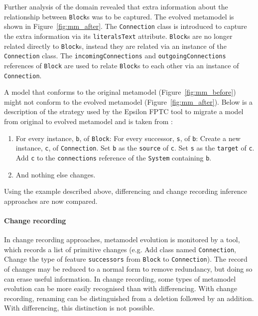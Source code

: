 Further analysis of the domain revealed that extra information about the relationship between \texttt{Block}s was to be captured. The evolved metamodel is shown in Figure~\ref{fig:mm_after}. The \texttt{Co\-nn\-ec\-ti\-on} class is introduced to capture the extra information via its \texttt{li\-te\-ra\-lsTe\-xt} attribute. \texttt{Block}s are no longer related directly to \texttt{Bl\-o\-ck}s, instead they are related via an instance of the \texttt{Co\-nn\-ec\-ti\-on} class. The \texttt{in\-com\-i\-ngCo\-nn\-ec\-ti\-o\-ns} and \texttt{ou\-tgo\-i\-ngCo\-nn\-ec\-ti\-o\-ns} references of \texttt{Bl\-o\-ck} are used to relate \texttt{Bl\-o\-ck}s to each other via an instance of \texttt{Co\-nn\-ec\-ti\-on}.

A model that conforms to the original metamodel (Figure~\ref{fig:mm_before}) might not conform to the evolved metamodel (Figure~\ref{fig:mm_after}). Below is a description of the strategy used by the Epsilon FPTC tool to migrate a model from original to evolved metamodel and is taken from \cite{rose09analysis}:

\begin{enumerate}
	\item For every instance, \texttt{b}, of \texttt{Block}:
		\subitem For every successor, \texttt{s}, of \texttt{b}:
			\subsubitem Create a new instance, \texttt{c}, of \texttt{Connection}.
			\subsubitem Set \texttt{b} as the \texttt{source} of \texttt{c}.
			\subsubitem Set \texttt{s} as the \texttt{target} of \texttt{c}.
			\subsubitem Add \texttt{c} to the \texttt{connections} reference of the \texttt{System} containing \texttt{b}.
	\item And nothing else changes.
\end{enumerate}

Using the example described above, differencing and change recording inference approaches are now compared. 

\paragraph{Change recording}
In change recording approaches, metamodel evolution is monitored by a tool, which records a list of primitive changes (e.g. Add class named \texttt{Connection}, Change the type of feature \texttt{successors} from \texttt{Block} to \texttt{Connection}). The record of changes may be reduced to a normal form to remove redundancy, but doing so can erase useful information. In change recording, some types of metamodel evolution can be more easily recognised than with differencing. With change recording, renaming can be distinguished from a deletion followed by an addition. With differencing, this distinction is not possible.

